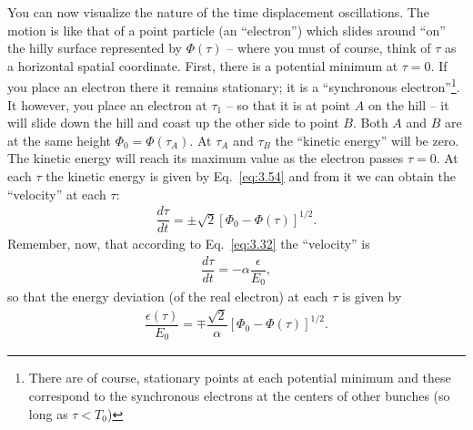 You can now visualize the nature of the time displacement oscillations. The motion is like that of a point particle (an ``electron'') which slides around ``on'' the hilly surface represented by $\Phi(\tau)$ -- where you must of course, think of $\tau$ as a horizontal spatial coordinate. First, there is a potential minimum at $\tau = 0$. If you place an electron there it remains stationary; it is a ``synchronous electron''\footnote{There are of course, stationary points at each potential minimum and these correspond to the synchronous electrons at the centers of other bunches (so long as $\tau < T_0$)}. It however, you place an electron at $\tau_1$ -- so that it is at point $A$ on the hill -- it will slide down the hill and coast up the other side to point $B$. Both $A$ and $B$ are at the same height $\Phi_0 = \Phi(\tau_A)$. At $\tau_A$ and $\tau_B$
 the ``kinetic energy'' will be zero. The kinetic energy will reach its maximum value as the electron passes $\tau = 0$. At each $\tau$ the kinetic energy is given by Eq.~\eqref{eq:3.54} and from it we can obtain the ``velocity'' at each $\tau$:
\begin{align}
	\dfrac{d\tau}{dt} = \pm \sqrt{2} \left[ \Phi_0 - \Phi(\tau) \right]^{1/2}.
\end{align}
Remember, now, that according to Eq.~\eqref{eq:3.32} the ``velocity'' is
\begin{align*}
	\dfrac{d\tau}{dt} = - \alpha \dfrac{\epsilon}{E_0},
\end{align*}
so that the energy deviation (of the real electron) at each $\tau$ is given by
\begin{align}\label{eq:3.56}
	\dfrac{\epsilon(\tau)}{E_0} = \mp \dfrac{\sqrt{2}}{\alpha} \left[ \Phi_0 - \Phi(\tau) \right]^{1/2}.
\end{align}

